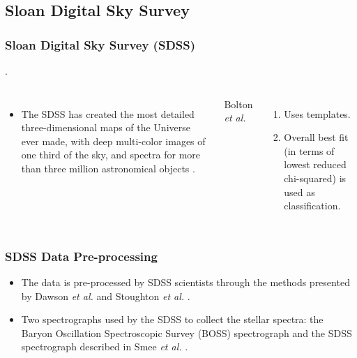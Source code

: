 \documentclass[aspectratio=169]{beamer}
\begin{document}
\subsection{Sloan Digital Sky Survey}
\begin{frame}
\frametitle{Sloan Digital Sky Survey (SDSS)}
. 
  \begin{block}

    \begin{columns}[t]
	\vspace{-1cm} 
	\begin{itemize}
	\item The SDSS has created the most detailed three-dimensional maps of the Universe ever made, with deep multi-color images of one third of the sky, and spectra for more than three million astronomical objects \cite{sdss}.
	\end{itemize}

Bolton \textit{et al.} \cite{Bolton}

\begin{enumerate}

\item Uses templates.
\item Overall best fit (in terms of lowest reduced chi-squared) is used as classification.

\end{enumerate}

    \end{columns}
  \end{block}

\end{frame}

\begin{frame}
\frametitle{SDSS Data Pre-processing}
\begin{itemize}
\item The data is pre-processed by SDSS scientists through the methods presented by Dawson \textit{et al. }\cite{Dawson} and Stoughton \textit{et al.}  \cite{Stoughton}.
\item Two spectrographs used by the SDSS to collect the stellar spectra: the Baryon Oscillation Spectroscopic Survey (BOSS) spectrograph and the SDSS spectrograph described in Smee \textit{et al.} \cite{Smee}.  
\end{itemize}
\end{frame}

\end{document}
